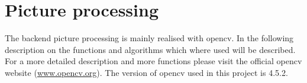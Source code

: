 \author{Florian Müller}
\chapter {Picture processing}

The backend picture processing is mainly realised with opencv.
In the following description on the functions and algorithms which where used will be described.
For a more detailed description and more functions please visit the official opencv website (\url{www.opencv.org}).
The version of opencv used in this project is 4.5.2.




